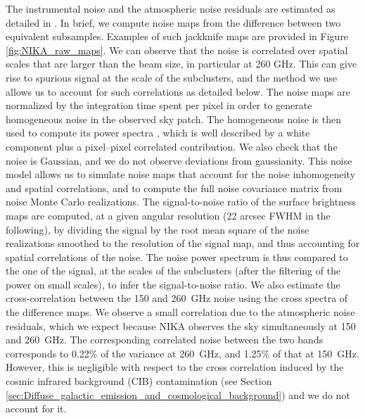 \documentclass[twocolumn,traditabstract]{aa}
\begin{document}
The instrumental noise and the atmospheric noise residuals are estimated as detailed in \cite{Adam2016}. In brief, we compute noise maps from the difference between two equivalent subsamples. Examples of such jackknife maps are provided in Figure \ref{fig:NIKA_raw_maps}. We can observe that the noise is correlated over spatial scales that are larger than the beam size, in particular at 260 GHz. This can give rise to spurious signal at the scale of the subclusters, and the method we use allows us to account for such correlations as detailed below. The noise maps are normalized by the integration time spent per pixel in order to generate homogeneous noise in the observed sky patch. The homogeneous noise is then used to compute its power spectra \cite[using the POKER software,][]{Ponthieu2011}, which is well described by a white component plus a pixel--pixel correlated contribution. We also check that the noise is Gaussian, and we do not observe deviations from gaussianity. This noise model allows us to simulate noise maps that account for the noise inhomogeneity and spatial correlations, and to compute the full noise covariance matrix from noise Monte Carlo realizations. The signal-to-noise ratio of the surface brightness maps are computed, at a given angular resolution (22 arcsec FWHM in the following), by dividing the signal by the root mean square of the noise realizations smoothed to the resolution of the signal map, and thus accounting for spatial correlations of the noise. The noise power spectrum is thus compared to the one of the signal, at the scales of the subclusters (after the filtering of the power on small scales), to infer the signal-to-noise ratio. We also estimate the cross-correlation between the 150 and 260~GHz noise using the cross spectra of the difference maps. We observe a small correlation due to the atmospheric noise residuals, which we expect because NIKA observes the sky simultaneously at 150 and 260~GHz. The corresponding correlated noise between the two bands corresponds to 0.22\% of the variance at 260~GHz, and 1.25\% of that at 150~GHz. However, this is negligible with respect to the cross correlation induced by the cosmic infrared background (CIB) contamination (see Section \ref{sec:Diffuse_galactic_emission_and_cosmological_background}) and we do not account for it.

\end{document}
